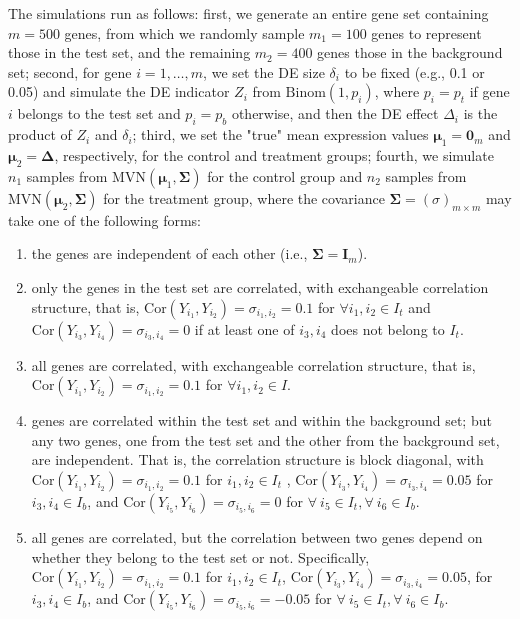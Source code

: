 \documentclass[useAMS,usenatbib, galley]{biom}
\newcommand{\aaCase}{a}
\newcommand{\aCase}{b}
\newcommand{\cCase}{c}
\newcommand{\eCase}{d}
\newcommand{\fCase}{e}
\begin{document}
	The simulations run as follows: first, we generate an entire gene set containing $m=500$ genes, from which we randomly sample $m_1 = 100$ genes to represent those in the test set, and the remaining $m_2=400$ genes those in the background set; second, for gene $i=1, \ldots, m$, we set the DE size $\delta_i$ to be fixed (e.g., 0.1 or 0.05) and simulate the DE indicator $Z_i$ from $\text{Binom}(1, p_i)$,  where $p_i= p_t$ if gene $i$ belongs to the test set and $p_i = p_b$  otherwise, and then the DE effect $\Delta_i$ is the product of $Z_i$ and $\delta_i$; third, we set the "true" mean expression values $\bm \mu_1 = \bm 0_m$ and $\bm \mu_2 = \bm \Delta$, respectively,  for the control and treatment groups; fourth, we simulate $n_1$ samples from $\text{MVN}(\bm \mu_1, \bm \Sigma)$ for the control group and $n_2$ samples from $\text{MVN}(\bm \mu_2, \bm \Sigma)$ for the treatment group, where the covariance $\bm \Sigma = (\sigma)_{m\times m} $ may take one of the following forms: 
	\begin{enumerate}
		\item[(\aaCase):] the genes are independent of each other (i.e., $\bm \Sigma = \bm I_m$).
		\item[(\aCase):] only the genes in the test set are correlated, with exchangeable correlation structure, that is, $\text{Cor}(Y_{i_1}, Y_{i_2})=\sigma_{i_1, i_2}=0.1$ for $\forall i_1, i_2 \in I_t$ and  $\text{Cor}(Y_{i_3}, Y_{i_4})=\sigma_{i_3, i_4}=0$ if at least one of $i_3, i_4$ does not belong to $I_t$.
		\item[(\cCase):] all genes are correlated, with exchangeable correlation structure, that is, $\text{Cor}(Y_{i_1}, Y_{i_2})=\sigma_{i_1, i_2}=0.1$ for $\forall i_1, i_2 \in I$.
		\item[(\eCase):] genes are correlated within the test set and within the background set; but any two genes, one from the test set and the other from the background set, are independent. That is, the correlation structure is block diagonal, with $\text{Cor}(Y_{i_1}, Y_{i_2})= \sigma_{i_1, i_2}= 0.1$ for $i_1, i_2 \in I_t$  , $\text{Cor}(Y_{i_3}, Y_{i_4}) = \sigma_{i_3, i_4}=0.05$ for $i_3, i_4\in I_b$, and  $\text{Cor}(Y_{i_5}, Y_{i_6})=\sigma_{i_5, i_6}= 0$ for $\forall ~i_5\in I_t, \forall~ i_6\in I_b$.
		\item[(\fCase):] all genes are correlated, but the correlation between two genes depend on whether they belong to the test set or not. Specifically, $\text{Cor}(Y_{i_1}, Y_{i_2})=\sigma_{i_1, i_2}=0.1$  for $i_1, i_2 \in I_t$,    $\text{Cor}(Y_{i_3}, Y_{i_4})=\sigma_{i_3, i_4} =0.05$, for $ i_3, i_4\in I_b$, and  $\text{Cor}(Y_{i_5}, Y_{i_6})= \sigma_{i_5, i_6}= -0.05$ for $\forall~ i_5\in I_t, \forall~ i_6\in I_b$.
	\end{enumerate}
	
\end{document}
